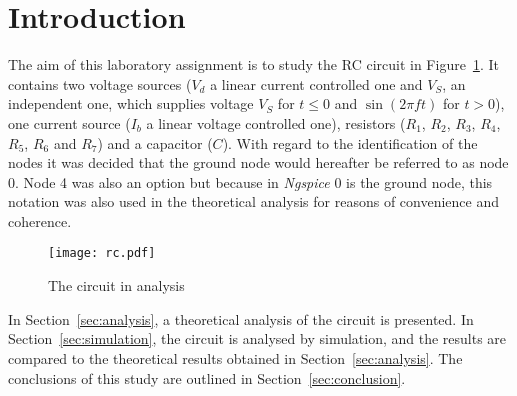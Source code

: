 \section{Introduction}
\label{sec:introduction}


The aim of this laboratory assignment is to study the RC circuit in Figure~\ref{fig:rc}. It contains two voltage sources ($V_d$ a linear current controlled one and $V_S$, an independent one, which supplies voltage $V_S$ for $t\leq0$ and $\sin (2 \pi f t)$ for $t>0$), one current source ($I_b$ a linear voltage controlled one), resistors ($R_1$, $R_2$, $R_3$, $R_4$, $R_5$, $R_6$ and $R_7$) and a capacitor ($C$).
With regard to the identification of the nodes it was decided that the ground node would hereafter be referred to as node 0. Node 4 was also an option but because in \textit{Ngspice} 0 is the ground node, this notation was also used in the theoretical analysis for reasons of convenience and coherence.


\lipsum[1-1]


\begin{figure}[h] \centering
\texttt{[image: rc.pdf]}
\caption{The circuit in analysis}
\label{fig:rc}
\end{figure}




In Section~\ref{sec:analysis}, a theoretical analysis of the circuit is
presented. In Section~\ref{sec:simulation}, the circuit is analysed by
simulation, and the results are compared to the theoretical results obtained in
Section~\ref{sec:analysis}. The conclusions of this study are outlined in
Section~\ref{sec:conclusion}.
